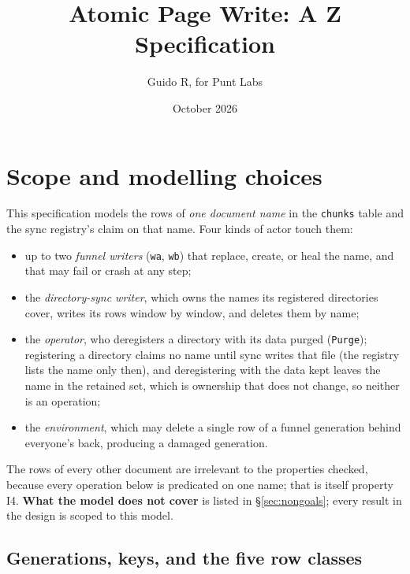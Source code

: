\documentclass[a4paper,10pt,fleqn]{article}
\newcommand{\field}[1]{\texttt{#1}}
\begin{document}
\title{Atomic Page Write: A Z Specification}
\author{Guido R, for Punt Labs}
\date{October 2026}
\maketitle

\section{Scope and modelling choices}
\label{sec:scope}

This specification models the rows of \emph{one document name} in the
\field{chunks} table and the sync registry's claim on that name. Four kinds of
actor touch them:

\begin{itemize}
  \item up to two \emph{funnel writers} (\field{wa}, \field{wb}) that replace,
    create, or heal the name, and that may fail or crash at any step;
  \item the \emph{directory-sync writer}, which owns the names its registered
    directories cover, writes its rows window by window, and deletes them by
    name;
  \item the \emph{operator}, who deregisters a directory with its data purged
    (\field{Purge}); registering a directory claims no name until sync writes
    that file (the registry lists the name only then), and deregistering with
    the data kept leaves the name in the retained set, which is ownership that
    does not change, so neither is an operation;
  \item the \emph{environment}, which may delete a single row of a funnel
    generation behind everyone's back, producing a damaged generation.
\end{itemize}

The rows of every other document are irrelevant to the properties checked,
because every operation below is predicated on one name; that is itself
property I4. \textbf{What the model does not cover} is listed in
\S\ref{sec:nongoals}; every result in the design is scoped to this model.

\subsection{Generations, keys, and the five row classes}
\end{document}
